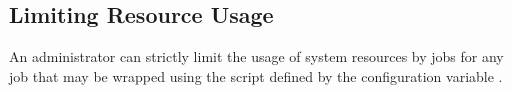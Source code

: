 \subsection{\label{sec:Resource-Limits}Limiting Resource Usage} 

An administrator can strictly limit the usage of system resources
by jobs for any job that may be wrapped using
the script defined by the configuration variable
.

\MoreTodo
